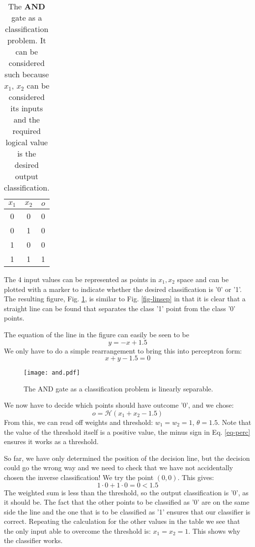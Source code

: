 \begin{table}[!ht]
  \begin{center}
  \begin{tabular}{||c|c||c||} \hline \hline
    $x_1$ & $x_2$ & $o$ \\ \hline
    0   &  0  & 0 \\
    0   &  1  & 0 \\
    1   &  0  & 0 \\
    1   &  1  & 1 \\ \hline
  \end{tabular}
  \end{center}
  \caption{The {\bf AND} gate as a classification problem. It can be considered such because $x_1$, $x_2$ can be considered its inputs and the required
    logical value is the desired output classification.}
  \label{tab-and}
\end{table}


The 4 input values can be represented as  points in $x_1, x_2$ space and can be plotted with a marker to indicate whether the desired classification is '0' or '1'.
The resulting figure, Fig. \ref{fig-and}, is similar to  Fig. \ref{fig-linsep} in that it is clear that a straight line can be found that separates the class '1' point
from the class '0' points.

The equation of the line in the figure can easily be seen to be
$$
y = -x + 1.5
$$
We only have to do a simple rearrangement to bring this into perceptron form:
$$
x + y - 1.5 = 0
$$

\begin{figure}[!ht]
  \begin{center}
    \texttt{[image: and.pdf]}
  \end{center}
  \caption{The AND gate as a classification problem is linearly separable.}
 \label{fig-and}
\end{figure}



We now have to decide which points should have outcome '0', and we chose:
\begin{equation}
  o = \mathcal{H}(x_1 + x_2 - 1.5)
  \label{eq-percthresh}
\end{equation}
From this, we can read off weights and threshold: $w_1 = w_2 =1$, $\theta = 1.5$. Note that the value of the threshold itself is a positive value, the minus sign in
Eq. \ref{eq-perc} ensures it works as a threshold.

So far, we have only determined the position of the decision line, but the decision could go the wrong way and we need to check that we have not accidentally chosen
the inverse classification!
We try the point $(0,0)$. This gives:
$$
1 \cdot 0 + 1 \cdot 0 = 0 < 1.5
$$
The weighted sum is less than the threshold, so the output classification is '0', as it should be. The fact that the other points to be classified as '0'
are on the same side the line and the one that is to be classified as '1' ensures that our classifier is correct. Repeating the calculation for the other values
in the table we see that the only input able to overcome the threshold is: $x_1 = x_2 =1$. This shows why the classifier works.


